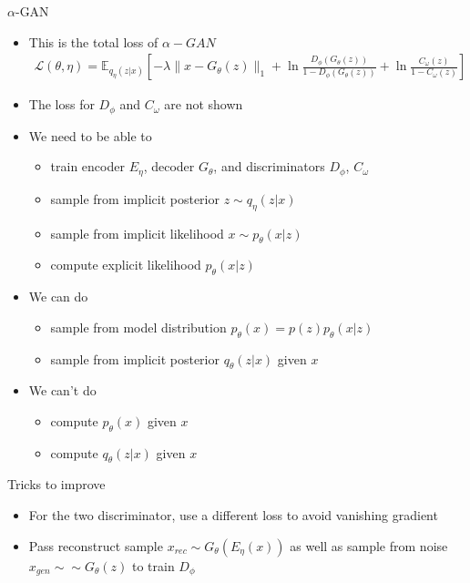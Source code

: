 \documentclass[compress]{beamer}
\newcommand{\expects}[2]{\mathbb{E}_{#1} \left[ #2 \right]}
\begin{document}
\begin{frame}[allowframebreaks]{$\alpha$-GAN}
    \begin{itemize}
        \item This is the total loss of $\alpha-GAN$
            \begin{align*}
                \mathcal{L}(\theta, \eta) = \expects{q_{\eta}(z|x)}{-\lambda\|x-G_{\theta}(z)\|_1 + \ln \frac{D_\phi(G_{\theta}(z))}{1- D_\phi(G_{\theta}(z)) } + \ln \frac{C_{\omega}(z)}{1-C_\omega(z)}}
            \end{align*}
        \item The loss for $D_\phi$ and $C_{\omega}$ are not shown
        \item We need to be able to
            \begin{itemize}
                \item train encoder $E_{\eta}$, decoder $G_{\theta}$, and discriminators $D_{\phi}$, $C_\omega$
                \item sample from implicit posterior $z\sim q_{\eta}(z|x)$
                \item sample from implicit likelihood $x\sim p_{\theta}(x|z)$
                \item compute explicit likelihood $p_{\theta}(x|z)$
            \end{itemize}
        \item We can do
            \begin{itemize}
                \item sample from model distribution $p_\theta(x)=p(z)p_\theta(x|z)$
                \item sample from implicit posterior $q_{\theta}(z|x)$ given $x$
            \end{itemize}
        \item We can't do
            \begin{itemize}
                \item compute $p_{\theta}(x)$ given $x$
                \item compute $q_{\theta}(z|x)$ given $x$
            \end{itemize}
    \end{itemize}
    \framebreak
    \begin{block}{Tricks to improve}
        \begin{itemize}
            \item For the two discriminator, use a different loss to avoid vanishing gradient
            \item Pass reconstruct sample $x_{rec} \sim G_{\theta}(E_{\eta}(x))$ as well as sample from noise $x_{gen}\sim \sim G_{\theta}(z)$ to train $D_{\phi}$

\end{itemize}
\end{block}
\end{frame}
\end{document}
